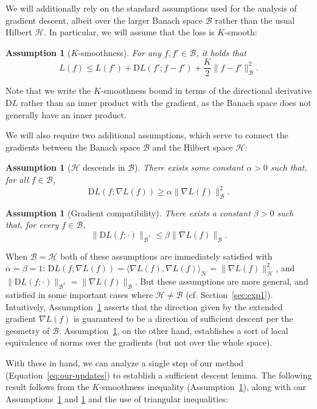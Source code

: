 \documentclass{article}
\newtheorem{assumption}[theorem]{Assumption}
\renewcommand{\H}{\mathcal{H}}
\newcommand{\B}{\mathcal{B}}
\newcommand{\D}{\mathrm{D}}
\begin{document}
We will additionally rely on the standard assumptions used for the analysis of gradient descent, albeit over the larger Banach space $\B$ rather than the usual Hilbert $\H$.
In particular, we will assume that the loss is $K$-smooth:
\begin{assumption}[$K$-smoothness]\label{assumpt:smoothness}
    For any $f, f' \in \B$, it holds that
    \[ L(f) \leq L(f') + \D L(f'; f - f') + \frac{K}{2} \lVert f - f' \rVert_\B^2. \]
\end{assumption}
Note that we write the $K$-smoothness bound in terms of the directional derivative $\D L$ rather than an inner product with the gradient, as the Banach space does not generally have an inner product.

We will also require two additional assumptions, which serve to connect the gradients between the Banach space $\B$ and the Hilbert space $\H$:
\begin{assumption}[$\H$ descends in $\B$]\label{assumpt:h-descends-in-b}
    There exists some constant $\alpha>0$ such that, for all $f \in \B$,
    \[ \D L(f; \nabla L(f)) \geq \alpha \lVert \nabla L(f) \rVert_\B^2. \]
\end{assumption}
\begin{assumption}[Gradient compatibility]\label{assumpt:grad-compat}
    There exists a constant $\beta > 0$ such that, for every $f \in \B$,
    \[ \lVert \D L(f; \cdot) \rVert_{\B^*} \leq \beta \lVert \nabla L(f) \rVert_{\B}. \]
\end{assumption}
When $\B = \H$ both of these assumptions are immediately satisfied with $\alpha = \beta = 1$: $\D L(f; \nabla L(f)) = \langle \nabla L(f), \nabla L(f) \rangle_\H = \lVert \nabla L(f) \rVert_\H^2$, and $\lVert \D L(f; \cdot) \rVert_{\B^*} = \lVert \nabla L(f) \rVert_{\B}$.
But these assumptions are more general, and satisfied in some important cases where $\H \neq \B$ (cf. Section~\ref{sec:exp1}).
Intuitively, Assumption~\ref{assumpt:h-descends-in-b} asserts that the direction given by the extended gradient $\nabla L(f)$ is guaranteed to be a direction of sufficient descent per the geometry of $\B$. Assumption~\ref{assumpt:grad-compat}, on the other hand, establishes a sort of local equivalence of norms over the gradients (but not over the whole space).

With these in hand, we can analyze a single step of our method (Equation~\ref{eq:our-updates}) to establish a sufficient descent lemma.
The following result follows from the $K$-smoothness inequality (Assumption~\ref{assumpt:smoothness}), along with our Assumptions~\ref{assumpt:h-descends-in-b} and \ref{assumpt:grad-compat} and the use of triangular inequalities:
\end{document}
